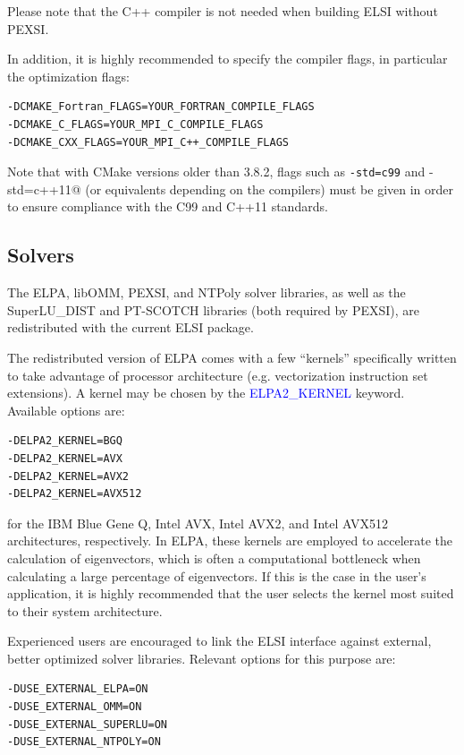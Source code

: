 \documentclass{report}
\begin{document}
Please note that the C++ compiler is not needed when building ELSI without PEXSI.

In addition, it is highly recommended to specify the compiler flags, in particular the optimization flags:
\begin{tcolorbox}
\begin{verbatim}
-DCMAKE_Fortran_FLAGS=YOUR_FORTRAN_COMPILE_FLAGS
-DCMAKE_C_FLAGS=YOUR_MPI_C_COMPILE_FLAGS
-DCMAKE_CXX_FLAGS=YOUR_MPI_C++_COMPILE_FLAGS
\end{verbatim}
\end{tcolorbox}

Note that with CMake versions older than 3.8.2, flags such as \verb+-std=c99+ and \verb@-std=c++11@ (or equivalents depending on the compilers) must be given in order to ensure compliance with the C99 and C++11 standards.

\subsection{Solvers}
\label{subsec:config_solvers}
The ELPA, libOMM, PEXSI, and NTPoly solver libraries, as well as the SuperLU\_DIST and PT-SCOTCH libraries (both required by PEXSI), are redistributed with the current ELSI package.

The redistributed version of ELPA comes with a few ``kernels'' specifically written to take advantage of processor architecture (e.g. vectorization instruction set extensions).  A kernel may be chosen by the \textcolor{blue}{ELPA2\_KERNEL} keyword.  Available options are:
\begin{tcolorbox}
\begin{verbatim}
-DELPA2_KERNEL=BGQ
-DELPA2_KERNEL=AVX
-DELPA2_KERNEL=AVX2
-DELPA2_KERNEL=AVX512
\end{verbatim}
\end{tcolorbox}

for the IBM Blue Gene Q, Intel AVX, Intel AVX2, and Intel AVX512 architectures, respectively.  In ELPA, these kernels are employed to accelerate the calculation of eigenvectors, which is often a computational bottleneck when calculating a large percentage of eigenvectors.  If this is the case in the user's application, it is highly recommended that the user selects the kernel most suited to their system architecture.

Experienced users are encouraged to link the ELSI interface against external, better optimized solver libraries.  Relevant options for this purpose are:
\begin{tcolorbox}
\begin{verbatim}
-DUSE_EXTERNAL_ELPA=ON
-DUSE_EXTERNAL_OMM=ON
-DUSE_EXTERNAL_SUPERLU=ON
-DUSE_EXTERNAL_NTPOLY=ON
\end{verbatim}
\end{tcolorbox}
\end{document}
